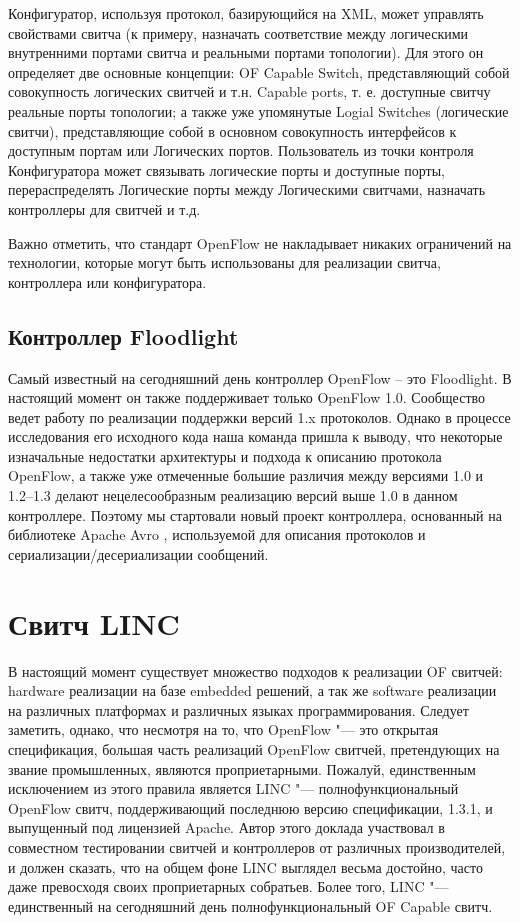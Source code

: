 \documentclass[10pt, a5paper]{article}
\begin{document}
Конфигуратор, используя протокол, базирующийся на XML, может управлять свойствами свитча (к примеру, назначать соответствие между логическими внутренними портами свитча и реальными портами топологии). Для этого он определяет две основные концепции: OF Capable Switch, представляющий собой совокупность логических свитчей и т.н. Capable ports, т. е. доступные свитчу реальные порты топологии; а также уже упомянутые Logial Switches (логические свитчи), представляющие собой в основном совокупность интерфейсов к доступным портам или Логических портов. Пользователь из точки контроля Конфигуратора может связывать логические порты и доступные порты, перераспределять Логические порты между Логическими свитчами, назначать контроллеры для свитчей и т.д.

Важно отметить, что стандарт OpenFlow не накладывает никаких ограничений на технологии, которые могут быть использованы для реализации свитча, контроллера или конфигуратора.

\subsection*{Контроллер Floodlight \cite{Orekhov3}}

Самый известный на сегодняшний день контроллер OpenFlow – это Floodlight. В настоящий момент он также поддерживает только OpenFlow 1.0. Сообщество ведет работу по реализации поддержки версий 1.x протоколов. Однако в процессе исследования его исходного кода наша команда пришла к выводу, что некоторые изначальные недостатки архитектуры и подхода к описанию протокола OpenFlow, а также уже отмеченные большие различия между версиями 1.0 и 1.2--1.3 делают нецелесообразным реализацию версий выше 1.0 в данном контроллере. Поэтому мы стартовали новый проект контроллера, основанный на библиотеке Apache Avro \cite{Orekhov4}, используемой для описания протоколов и сериализации/десериализации сообщений.

\section*{Свитч LINC \cite{Orekhov5}}

В настоящий момент существует множество подходов к реализации OF свитчей: hardware реализации на базе embedded решений, а так же software реализации на различных платформах и различных языках программирования. Следует заметить, однако, что несмотря на то, что OpenFlow "--- это открытая спецификация, большая часть реализаций OpenFlow  свитчей, претендующих на звание промышленных, являются проприетарными. Пожалуй, единственным исключением из этого правила является LINC "--- полнофункциональный OpenFlow свитч, поддерживающий последнюю версию спецификации, 1.3.1, и выпущенный под лицензией Apache. Автор этого доклада участвовал в совместном тестировании свитчей и контроллеров от различных производителей, и должен сказать, что на общем фоне LINC выглядел весьма достойно, часто даже превосходя своих проприетарных собратьев. Более того, LINC "--- единственный на сегодняшний день полнофункциональный OF Capable свитч.
\end{document}
